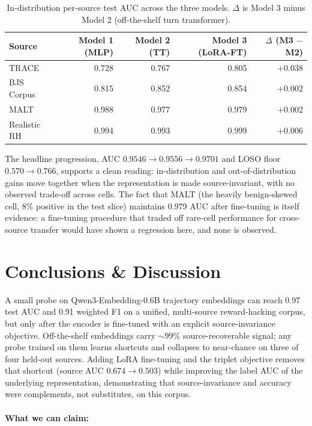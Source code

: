 \documentclass{article}
\begin{document}
\begin{table}[h]
  \caption{In-distribution per-source test AUC across the three models. $\Delta$ is Model 3 minus Model 2 (off-the-shelf turn transformer).}
  \label{tab:per-source-iid}
  \centering
  \begin{tabular}{lrrrr}
    \toprule
    Source & Model 1 (MLP) & Model 2 (TT) & Model 3 (LoRA-FT) & $\Delta$ (M3 $-$ M2) \\
    \midrule
    TRACE          & 0.728 & 0.767 & 0.805 & $+0.038$ \\
    BJS Corpus     & 0.815 & 0.852 & 0.854 & $+0.002$ \\
    MALT           & 0.988 & 0.977 & 0.979 & $+0.002$ \\
    Realistic RH   & 0.994 & 0.993 & 0.999 & $+0.006$ \\
    \bottomrule
  \end{tabular}
\end{table}

The headline progression, AUC $0.9546 \to 0.9556 \to 0.9701$ and LOSO floor $0.570 \to 0.766$, supports a clean reading: in-distribution and out-of-distribution gains move together when the representation is made source-invariant, with no observed trade-off across cells. The fact that MALT (the heavily benign-skewed cell, 8\% positive in the test slice) maintains 0.979 AUC after fine-tuning is itself evidence: a fine-tuning procedure that traded off rare-cell performance for cross-source transfer would have shown a regression here, and none is observed.


\section{Conclusions \& Discussion}

A small probe on Qwen3-Embedding-0.6B trajectory embeddings can reach 0.97 test AUC and 0.91 weighted F1 on a unified, multi-source reward-hacking corpus, but only after the encoder is fine-tuned with an explicit source-invariance objective. Off-the-shelf embeddings carry $\sim$99\% source-recoverable signal; any probe trained on them learns shortcuts and collapses to near-chance on three of four held-out sources. Adding LoRA fine-tuning and the triplet objective removes that shortcut (source AUC $0.674 \to 0.503$) while improving the label AUC of the underlying representation, demonstrating that source-invariance and accuracy were complements, not substitutes, on this corpus.

\paragraph{What we can claim:}
\end{document}
